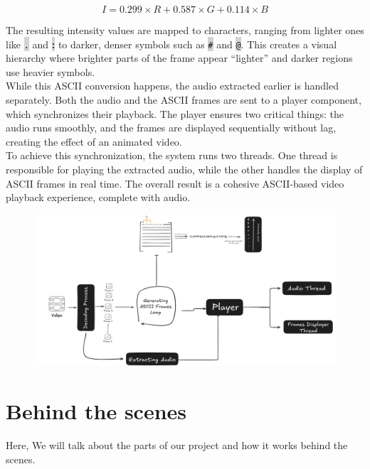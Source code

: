 \documentclass[a4paper,12pt]{article}
\begin{document}
$$I = 0.299 \times R + 0.587 \times G + 0.114 \times B$$

The resulting intensity values are mapped to characters, ranging from lighter ones like \colorbox{lightgray}{\texttt{.}} and \colorbox{lightgray}{\textbf{:}} to darker, denser symbols such as \colorbox{lightgray}{\texttt{\#}} and \colorbox{lightgray}{\texttt{@}}. This creates a visual hierarchy where brighter parts of the frame appear ``lighter'' and darker regions use heavier symbols.\\

While this ASCII conversion happens, the audio extracted earlier is handled separately. Both the audio and the ASCII frames are sent to a player component, which synchronizes their playback. The player ensures two critical things: the audio runs smoothly, and the frames are displayed sequentially without lag, creating the effect of an animated video.\\

To achieve this synchronization, the system runs two threads. One thread is responsible for playing the extracted audio, while the other handles the display of ASCII frames in real time. The overall result is a cohesive ASCII-based video playback experience, complete with audio.\\

\begin{figure}
    
    \centering
    \includegraphics*[scale=0.2]{Arch}
\end{figure}



\section{Behind the scenes}
Here, We will talk about the parts of our project and how it works behind the scenes.
\end{document}
